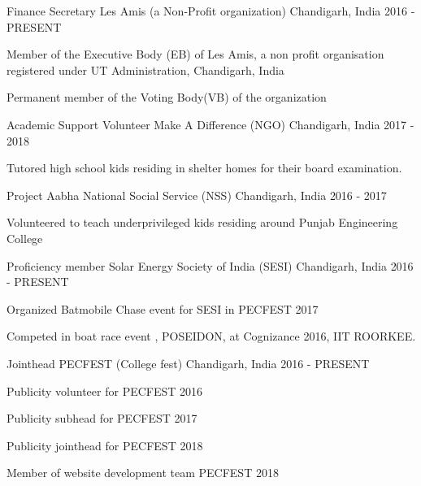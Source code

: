 \begin{cventries}
  \cventry
    {Finance Secretary}
    {Les Amis (a Non-Profit organization)}
    {Chandigarh, India}
    {2016 - PRESENT}
    {
      \begin{cvitems}
        \item {Member of the Executive Body (EB) of Les Amis, a non profit organisation registered under UT Administration, Chandigarh, India}
        \item {Permanent member of the Voting Body(VB) of the organization}
      \end{cvitems}
    }
  \cventry
    {Academic Support Volunteer}
    {Make A Difference (NGO)}
    {Chandigarh, India}
    {2017 - 2018}
    {
      \begin{cvitems}
        \item {Tutored high school kids residing in shelter homes for their board examination.}
      \end{cvitems}
    }
   \cventry
    {Project Aabha}
    {National Social Service (NSS)}
    {Chandigarh, India}
    {2016 - 2017}
    {
      \begin{cvitems}
        \item Volunteered to teach underprivileged kids residing around Punjab Engineering College
      \end{cvitems}
    }
    \cventry
    {Proficiency member}
    {Solar Energy Society of India (SESI)}
    {Chandigarh, India}
    {2016 - PRESENT}
    {
      \begin{cvitems}
        \item Organized Batmobile Chase event for SESI in PECFEST 2017
        \item Competed in boat race event , POSEIDON, at Cognizance 2016, IIT ROORKEE.
      \end{cvitems}
    }
    \cventry
    {Jointhead}
    {PECFEST (College fest)}
    {Chandigarh, India}
    {2016 - PRESENT}
    {
      \begin{cvitems}
        \item Publicity volunteer for PECFEST 2016
        \item Publicity subhead for PECFEST 2017
        \item Publicity jointhead for PECFEST 2018
        \item Member of website development team PECFEST 2018
      \end{cvitems}
    }
   
\end{cventries}
